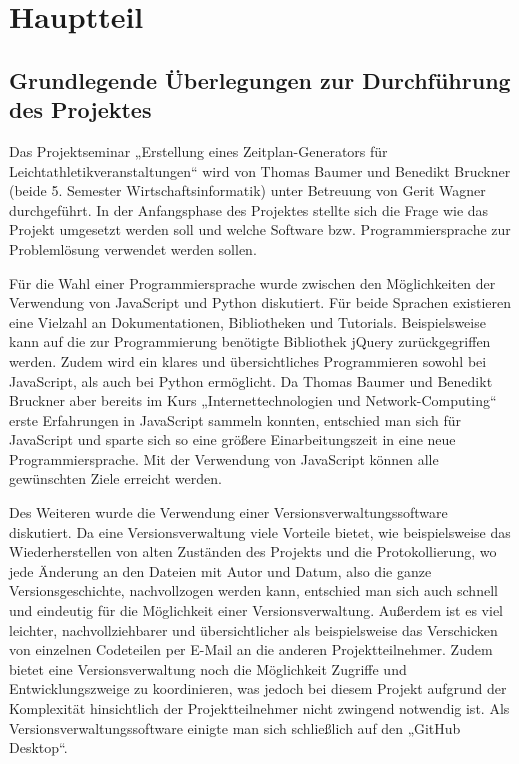 
\chapter{Hauptteil}
\label{chap:Hauptteil}

\section{Grundlegende Überlegungen zur Durchführung des Projektes}
Das Projektseminar „Erstellung eines Zeitplan-Generators für Leichtathletikveranstaltungen“ wird von Thomas Baumer und Benedikt Bruckner (beide 5. Semester Wirtschaftsinformatik) unter Betreuung von Gerit Wagner durchgeführt. In der Anfangsphase des Projektes stellte sich die Frage wie das Projekt umgesetzt werden soll und welche Software bzw. Programmiersprache zur Problemlösung verwendet werden sollen. 

Für die Wahl einer Programmiersprache wurde zwischen den Möglichkeiten der Verwendung von JavaScript und Python diskutiert. Für beide Sprachen existieren eine Vielzahl an Dokumentationen, Bibliotheken und Tutorials. Beispielsweise kann auf die zur Programmierung benötigte Bibliothek jQuery zurückgegriffen werden. Zudem wird ein klares und übersichtliches Programmieren sowohl bei JavaScript, als auch bei Python ermöglicht. Da Thomas Baumer und Benedikt Bruckner aber bereits im Kurs „Internettechnologien und Network-Computing“ erste Erfahrungen in JavaScript sammeln konnten, entschied man sich für JavaScript und sparte sich so eine größere Einarbeitungszeit in eine neue Programmiersprache. Mit der Verwendung von JavaScript können alle gewünschten Ziele erreicht werden.

Des Weiteren wurde die Verwendung einer Versionsverwaltungssoftware diskutiert. Da eine Versionsverwaltung viele Vorteile bietet, wie beispielsweise das Wiederherstellen von alten Zuständen des Projekts und die Protokollierung, wo jede Änderung an den Dateien mit Autor und Datum, also die ganze Versionsgeschichte, nachvollzogen werden kann, entschied man sich auch schnell und eindeutig für die Möglichkeit einer Versionsverwaltung. Außerdem ist es viel leichter, nachvollziehbarer und übersichtlicher als beispielsweise das Verschicken von einzelnen Codeteilen per E-Mail an die anderen Projektteilnehmer. Zudem bietet eine Versionsverwaltung noch die Möglichkeit Zugriffe und Entwicklungszweige zu koordinieren, was jedoch bei diesem Projekt aufgrund der Komplexität hinsichtlich der Projektteilnehmer nicht zwingend notwendig ist.
Als Versionsverwaltungssoftware einigte man sich schließlich auf den „GitHub Desktop“.  

